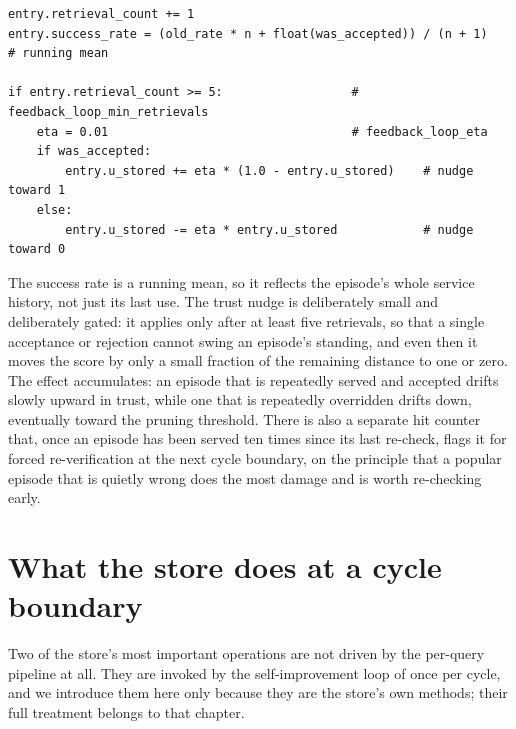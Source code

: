 \begin{lstlisting}[caption={Retrieval feedback, condensed from \texttt{caem/memory/store.py}.}, label={lst:feedback}]
entry.retrieval_count += 1
entry.success_rate = (old_rate * n + float(was_accepted)) / (n + 1)   # running mean

if entry.retrieval_count >= 5:                  # feedback_loop_min_retrievals
    eta = 0.01                                  # feedback_loop_eta
    if was_accepted:
        entry.u_stored += eta * (1.0 - entry.u_stored)    # nudge toward 1
    else:
        entry.u_stored -= eta * entry.u_stored            # nudge toward 0
\end{lstlisting}

The success rate is a running mean, so it reflects the episode's whole service history,
not just its last use. The trust nudge is deliberately small and deliberately gated: it
applies only after at least five retrievals, so that a single acceptance or rejection
cannot swing an episode's standing, and even then it moves the score by only a small
fraction of the remaining distance to one or zero. The effect accumulates: an episode
that is repeatedly served and accepted drifts slowly upward in trust, while one that is
repeatedly overridden drifts down, eventually toward the pruning threshold. There is
also a separate hit counter that, once an episode has been served ten times since its
last re-check, flags it for forced re-verification at the next cycle boundary, on the
principle that a popular episode that is quietly wrong does the most damage and is worth
re-checking early.

\section{What the store does at a cycle boundary}
\label{sec:memory-cycle-ops}

Two of the store's most important operations are not driven by the per-query pipeline at
all. They are invoked by the self-improvement loop of  once per cycle,
and we introduce them here only because they are the store's own methods; their full
treatment belongs to that chapter.

